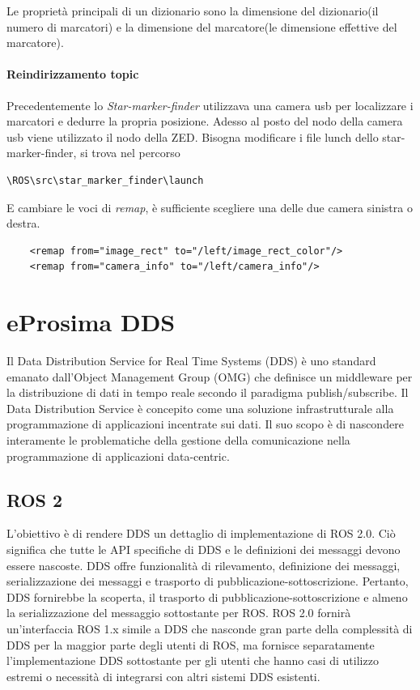 \documentclass[a4paper]{article}
\begin{document}
Le proprietà principali di un dizionario sono la dimensione del dizionario(il numero di marcatori) e la dimensione del marcatore(le dimensione effettive del marcatore).
\paragraph{Reindirizzamento topic}
Precedentemente lo \textit{Star-marker-finder} utilizzava una camera usb per localizzare i marcatori e dedurre la propria posizione. Adesso al posto del nodo della camera usb viene utilizzato il nodo della ZED.
Bisogna modificare i file lunch dello star-marker-finder, si trova nel percorso
\begin{verbatim}
\ROS\src\star_marker_finder\launch
\end{verbatim}
E cambiare le voci di \textit{remap}, è sufficiente scegliere una delle due camera sinistra o destra.
\begin{verbatim}
    <remap from="image_rect" to="/left/image_rect_color"/>
    <remap from="camera_info" to="/left/camera_info"/>
\end{verbatim}

\newpage
\section{eProsima DDS}

Il Data Distribution Service for Real Time Systems (DDS) è uno standard emanato dall'Object Management Group (OMG) che definisce un middleware per la distribuzione di dati in tempo reale secondo il paradigma publish/subscribe.
Il Data Distribution Service è concepito come una soluzione infrastrutturale alla programmazione di applicazioni incentrate sui dati. Il suo scopo è di nascondere interamente le problematiche della gestione della comunicazione nella programmazione di applicazioni data-centric.

\subsection{ROS 2}
L'obiettivo è di rendere DDS un dettaglio di implementazione di ROS 2.0. Ciò significa che tutte le API specifiche di DDS e le definizioni dei messaggi devono essere nascoste. DDS offre funzionalità di rilevamento, definizione dei messaggi, serializzazione dei messaggi e trasporto di pubblicazione-sottoscrizione. Pertanto, DDS fornirebbe la scoperta, il trasporto di pubblicazione-sottoscrizione e almeno la serializzazione del messaggio sottostante per ROS. ROS 2.0 fornirà un'interfaccia ROS 1.x simile a DDS che nasconde gran parte della complessità di DDS per la maggior parte degli utenti di ROS, ma fornisce  separatamente l'implementazione DDS sottostante per gli utenti che hanno casi di utilizzo estremi o necessità di integrarsi con altri sistemi DDS esistenti.
\end{document}
